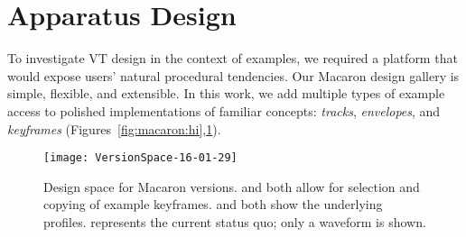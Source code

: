 %
%
\section{Apparatus Design}
%
To investigate VT design in the context of examples, we required a platform that would expose users' natural procedural tendencies. 
Our Macaron design gallery is simple, flexible, and extensible.
In this work, we add multiple types of example access to polished implementations of familiar concepts: \emph{tracks}, \emph{envelopes}, and \emph{keyframes}
(Figures~\ref{fig:macaron:hi},\ref{fig:versions}).

\begin{figure}[htb]
    \centering
    \texttt{[image: VersionSpace-16-01-29]}
    \caption{Design space for Macaron versions. \hi and \select both allow for selection and copying of example keyframes. \vis and \hi both show the underlying profiles. \lo represents the current status quo; only a waveform is shown.
    }
    \label{fig:versions}
\end{figure}


